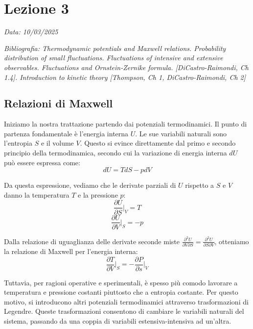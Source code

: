 \chapter{Lezione 3}
\label{chap:lezione_03} %

\begin{flushright}
\textit{Data: 10/03/2025}
\end{flushright}
\textit{Bibliografia: Thermodynamic potentials and Maxwell relations. Probability distribution of small fluctuations. Fluctuations of intensive and extensive observables. Fluctuations and Ornstein-Zernike formula. [DiCastro-Raimondi, Ch 1.4]. Introduction to kinetic theory [Thompson, Ch 1, DiCastro-Raimondi, Ch 2]}


\section{Relazioni di Maxwell}

Iniziamo la nostra trattazione partendo dai potenziali termodinamici. Il punto di partenza fondamentale è l'energia interna $U$. Le sue variabili naturali sono l'entropia $S$ e il volume $V$. Questo si evince direttamente dal primo e secondo principio della termodinamica, secondo cui la variazione di energia interna $dU$ può essere espressa come:
\begin{equation}
    dU = TdS - pdV
    \label{eq:dU_ch3}
\end{equation}

Da questa espressione, vediamo che le derivate parziali di $U$ rispetto a $S$ e $V$ danno la temperatura $T$ e la pressione $p$:
\begin{equation}
    \frac{\partial U}{\partial S} \bigg|_{V} = T
    \label{eq:dU_dS}
\end{equation}
\begin{equation}
    \frac{\partial U}{\partial V} \bigg|_{S} = -p
    \label{eq:dU_dV}
\end{equation}

Dalla relazione di uguaglianza delle derivate seconde miste $\frac{\partial^2 U}{\partial V \partial S} = \frac{\partial^2 U}{\partial S \partial V}$, otteniamo la relazione di Maxwell per l'energia interna:
\begin{equation}
    \frac{\partial T}{\partial V}\bigg|_{S}=-\frac{\partial P}{\partial s}\bigg|_{V}
    \label{eq:maxwell_U_ch3}
\end{equation}

Tuttavia, per ragioni operative e sperimentali, è spesso più comodo lavorare a temperatura e pressione costanti piuttosto che a entropia costante. Per questo motivo, si introducono altri potenziali termodinamici attraverso trasformazioni di Legendre. Queste trasformazioni consentono di cambiare le variabili naturali del sistema, passando da una coppia di variabili estensiva-intensiva ad un'altra.

